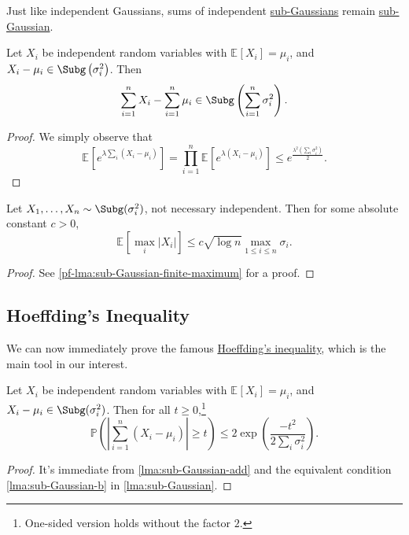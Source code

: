 Just like independent Gaussians, sums of independent \hyperref[def:sub-Gaussian]{sub-Gaussians} remain \hyperref[def:sub-Gaussian]{sub-Gaussian}.

\begin{lemma}\label{lma:sub-Gaussian-add}
	Let \(X_i\) be independent random variables with \(\mathbb{E}_{}\left[X_i \right] = \mu _i\), and \(X_i - \mu _i \in \Subg\left( \sigma _i^2 \right)  \). Then
	\[
		\sum_{i=1}^n X_i - \sum_{i=1}^n \mu _i \in \Subg\left( \sum_{i=1}^n \sigma _i^2 \right) .
	\]
\end{lemma}
\begin{proof}
	We simply observe that
	\[
		\mathbb{E}_{}\left[e^{\lambda \sum_{i} (X_i - \mu _i)} \right]
		= \prod _{i=1}^n \mathbb{E}_{}\left[e^{\lambda (X_i - \mu _i)} \right]
		\leq e^{\frac{\lambda ^2 (\sum_{i} \sigma _i^2)}{2}}.
	\]
\end{proof}

\begin{lemma}\label{lma:sub-Gaussian-finite-maximum}
	Let \(X_1, \dots , X_n \sim \Subg(\sigma _i^{2} ) \), not necessary independent. Then for some absolute constant \(c > 0\),
	\[
		\mathbb{E}_{}\left[\max _i \vert X_i \vert \right] \leq c \sqrt{\log n} \max _{1 \leq i \leq n} \sigma _i.
	\]
\end{lemma}
\begin{proof}
	See \autoref{pf-lma:sub-Gaussian-finite-maximum} for a proof.
\end{proof}
\subsection{Hoeffding's Inequality}
We can now immediately prove the famous \hyperref[thm:Hoeffding-inequality]{Hoeffding's inequality}, which is the main tool in our interest.

\begin{theorem}\label{thm:Hoeffding-inequality}
	Let \(X_i\) be independent random variables with \(\mathbb{E}_{}\left[X_i \right] = \mu _i\), and \(X_i - \mu _i \in \Subg(\sigma _i^2) \). Then for all \(t \geq 0\),\footnote{One-sided version holds without the factor \(2\).}
	\[
		\mathbb{P} \left( \left\vert \sum_{i=1}^n (X_i - \mu _i) \right\vert \geq t \right) \leq 2 \exp (\frac{-t^2}{2 \sum_{i} \sigma _i^2}).
	\]
\end{theorem}
\begin{proof}
	It's immediate from \autoref{lma:sub-Gaussian-add} and the equivalent condition \autoref{lma:sub-Gaussian-b} in \autoref{lma:sub-Gaussian}.
\end{proof}